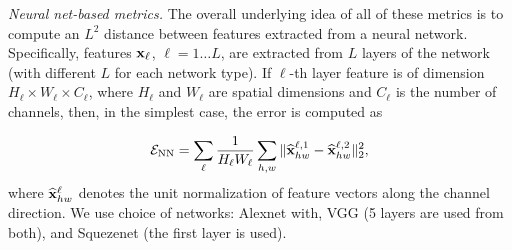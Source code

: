 


\noindent\emph{Neural net-based metrics.} The overall underlying idea of all of these metrics is to compute an $L^2$ distance between features extracted
from a neural network.  Specifically, features $\mathbf{x}_\ell$, $\ell = 1\ldots L$,
are extracted from $L$ layers of the network (with different $L$ for each network type).  If $\ell$-th layer feature is of dimension $H_\ell \times W_\ell \times C_\ell$,
where $H_\ell$ and $W_\ell$ are spatial dimensions and $C_\ell$ is the number of channels, then, in the simplest case, the error is computed as

\begin{equation*}
\mathcal{E}_{\mathrm{NN}} = \sum_\ell \frac{1}{{H_\ell W_\ell}} \sum_{h,w} \| \widehat{\mathbf{x}}^{\ell,1}_{hw} - \widehat{\mathbf{x}}^{\ell,2}_{hw}\|^2_2,
\end{equation*}
where $\widehat{\mathbf{x}}_{hw}^\ell$ denotes the unit normalization of feature vectors along the channel direction. 
We use \cite{Zhang_2018_CVPR} choice of networks:  Alexnet \cite{krizhevsky2012imagenet} with, VGG  \cite{Simonyan14c} (5 layers are used from both),
and  Squezenet \cite{i2016squeezenet} (the first layer is used). 


